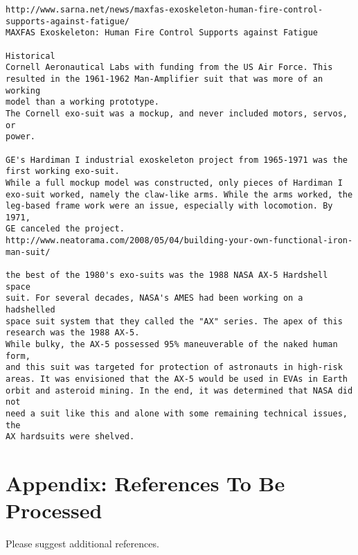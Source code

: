 \documentclass[letterpaper,12pt,fullpage]{article}
\begin{document}
\begin{verbatim}
http://www.sarna.net/news/maxfas-exoskeleton-human-fire-control-supports-against-fatigue/
MAXFAS Exoskeleton: Human Fire Control Supports against Fatigue

Historical
Cornell Aeronautical Labs with funding from the US Air Force. This
resulted in the 1961-1962 Man-Amplifier suit that was more of an working
model than a working prototype.
The Cornell exo-suit was a mockup, and never included motors, servos, or
power.

GE's Hardiman I industrial exoskeleton project from 1965-1971 was the
first working exo-suit.
While a full mockup model was constructed, only pieces of Hardiman I
exo-suit worked, namely the claw-like arms. While the arms worked, the
leg-based frame work were an issue, especially with locomotion. By 1971,
GE canceled the project.
http://www.neatorama.com/2008/05/04/building-your-own-functional-iron-man-suit/

the best of the 1980's exo-suits was the 1988 NASA AX-5 Hardshell space
suit. For several decades, NASA's AMES had been working on a hadshelled
space suit system that they called the "AX" series. The apex of this
research was the 1988 AX-5.
While bulky, the AX-5 possessed 95% maneuverable of the naked human form,
and this suit was targeted for protection of astronauts in high-risk
areas. It was envisioned that the AX-5 would be used in EVAs in Earth
orbit and asteroid mining. In the end, it was determined that NASA did not
need a suit like this and alone with some remaining technical issues, the
AX hardsuits were shelved.
\end{verbatim}

\newpage

\section{Appendix: References To Be Processed}

Please suggest additional references.
\end{document}
